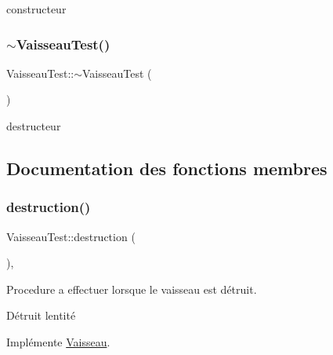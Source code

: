 constructeur 

\mbox{\label{class_vaisseau_test_ada9b5788bc092ecede953248cd6133e8}} 
\subsubsection{\texorpdfstring{$\sim$\+Vaisseau\+Test()}{~VaisseauTest()}}
{\footnotesize\ttfamily Vaisseau\+Test\+::$\sim$\+Vaisseau\+Test (\begin{DoxyParamCaption}{ }\end{DoxyParamCaption})}



destructeur 



\subsection{Documentation des fonctions membres}
\mbox{\label{class_vaisseau_test_a5b8b67886ecb73d8f720f8499ef3c378}} 
\subsubsection{\texorpdfstring{destruction()}{destruction()}}
{\footnotesize\ttfamily Vaisseau\+Test\+::destruction (\begin{DoxyParamCaption}{ }\end{DoxyParamCaption})\hspace{0.3cm}{\ttfamily [inline]}, {\ttfamily [virtual]}}



Procedure a effectuer lorsque le vaisseau est détruit. 

Détruit l\textquotesingle{}entité 

Implémente \hyperlink{class_vaisseau_af4f490c5fd9e171b23067ec73aa737ad}{Vaisseau}.

\mbox{\label{class_vaisseau_test_a83da402707d73465178b4e654d2e054a}} 
